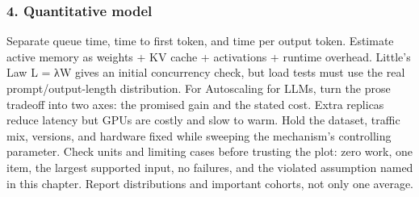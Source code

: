 \subsubsection*{4. Quantitative model}
Separate queue time, time to first token, and time per output token. Estimate active memory as weights + KV cache + activations + runtime overhead. Little's Law L = λW gives an initial concurrency check, but load tests must use the real prompt/output-length distribution.
For Autoscaling for LLMs, turn the prose tradeoff into two axes: the promised gain and the stated cost. Extra replicas reduce latency but GPUs are costly and slow to warm. Hold the dataset, traffic mix, versions, and hardware fixed while sweeping the mechanism's controlling parameter.
Check units and limiting cases before trusting the plot: zero work, one item, the largest supported input, no failures, and the violated assumption named in this chapter. Report distributions and important cohorts, not only one average.
